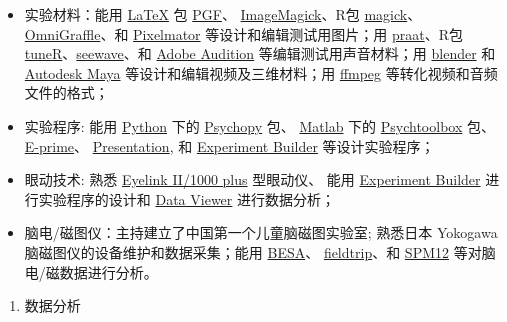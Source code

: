 \documentclass[
  12pt,
]{article}
\providecommand{\tightlist}{%
  \setlength{\itemsep}{0pt}\setlength{\parskip}{0pt}}
\begin{document}
\begin{itemize}
\item
  实验材料：能用 \href{https://www.latex-project.org}{LaTeX} 包
  \href{https://ctan.org/pkg/pgf?lang=en}{PGF}、
  \href{https://imagemagick.org}{ImageMagick}、R包
  \href{https://cran.r-project.org/web/packages/magick/index.html}{magick}、
  \href{https://www.omnigroup.com/omnigraffle/}{OmniGraffle}、和
  \href{https://www.pixelmator.com}{Pixelmator}
  等设计和编辑测试用图片；用
  \href{http://www.fon.hum.uva.nl/praat/}{praat}、R包
  \href{https://cran.r-project.org/web/packages/tuneR/index.html}{tuneR}、\href{https://cran.r-project.org/package=seewave}{seewave}、和
  \href{https://www.adobe.com/products/audition.html}{Adobe Audition}
  等编辑测试用声音材料；用 \href{https://www.blender.org}{blender} 和
  \href{https://www.autodesk.com/products/maya/overview}{Autodesk Maya}
  等设计和编辑视频及三维材料；用 \href{https://ffmpeg.org}{ffmpeg}
  等转化视频和音频文件的格式；
\item
  实验程序: 能用 \href{https://www.python.org}{Python} 下的
  \href{http://www.psychopy.org}{Psychopy} 包、
  \href{https://www.mathworks.com/products/matlab.html}{Matlab} 下的
  \href{http://psychtoolbox.org}{Psychtoolbox} 包、
  \href{https://www.pstnet.com/eprime.cfm}{E-prime}、
  \href{https://www.neurobs.com/presentation}{Presentation}, 和
  \href{https://www.sr-research.com/experiment-builder/}{Experiment
  Builder} 等设计实验程序；
\item
  眼动技术: 熟悉 \href{https://www.sr-research.com}{Eyelink II/1000
  plus} 型眼动仪、 能用
  \href{https://www.sr-research.com/experiment-builder/}{Experiment
  Builder} 进行实验程序的设计和
  \href{https://www.sr-research.com/data-viewer/}{Data Viewer}
  进行数据分析；
\item
  脑电/磁图仪：主持建立了中国第一个儿童脑磁图实验室; 熟悉日本 Yokogawa
  脑磁图仪的设备维护和数据采集；能用 \href{http://www.besa.de}{BESA}、
  \href{http://www.fieldtriptoolbox.org}{fieldtrip}、和
  \href{https://github.com/neurodebian/spm12}{SPM12}
  等对脑电/磁数据进行分析。
\end{itemize}

\begin{enumerate}
\def\labelenumi{\arabic{enumi}.}
\setcounter{enumi}{1}
\tightlist
\item
  数据分析
\end{enumerate}
\end{document}
